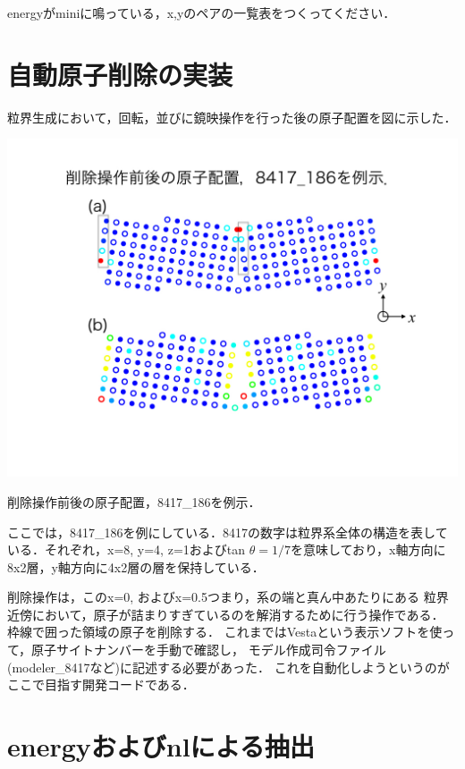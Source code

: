 energyがminiに鳴っている，x,yのペアの一覧表をつくってください．

    \section{自動原子削除の実装}\label{ux81eaux52d5ux539fux5b50ux524aux9664ux306eux5b9fux88c5}

粒界生成において，回転，並びに鏡映操作を行った後の原子配置を図に示した．

\begin{center}
\includegraphics[width=150mm]{../.././auto_delete/auto_delete_002.jpeg}
\end{center}
削除操作前後の原子配置，8417\_186を例示．

\label{fig:}

ここでは，8417\_186を例にしている．8417の数字は粒界系全体の構造を表している．それぞれ，x=8,
y=4, z=1およびtan
\(\theta=1/7\)を意味しており，x軸方向に8x2層，y軸方向に4x2層の層を保持している．

削除操作は，このx=0, およびx=0.5つまり，系の端と真ん中あたりにある
粒界近傍において，原子が詰まりすぎているのを解消するために行う操作である．
枠線で囲った領域の原子を削除する．
これまではVestaという表示ソフトを使って，原子サイトナンバーを手動で確認し，
モデル作成司令ファイル(modeler\_8417など)に記述する必要があった．
これを自動化しようというのがここで目指す開発コードである．

    \section{energyおよびnlによる抽出}\label{energyux304aux3088ux3073nlux306bux3088ux308bux62bdux51fa}


